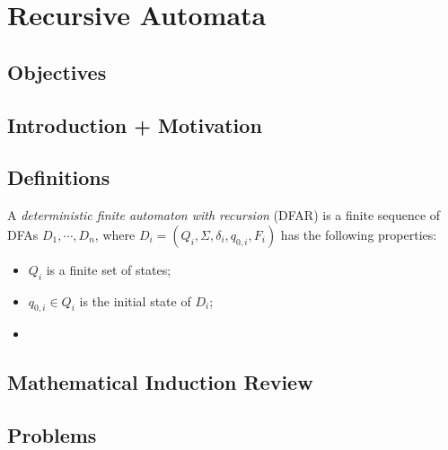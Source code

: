 \chapter{Recursive Automata}

\section{Objectives}

\section{Introduction + Motivation}

\section{Definitions}

A \emph{deterministic finite automaton with recursion} (DFAR) is a finite sequence of DFAs $D_1, \cdots, D_n$, where $D_i = (Q_i, \Sigma, \delta_i, q_{0,i}, F_i)$ has the following properties:
\begin{itemize}
	\item $Q_i$ is a finite set of states;
	\item $q_{0,i} \in Q_i$ is the initial state of $D_i$;
	\item 
\end{itemize}

\section{Mathematical Induction Review}

\section{Problems}
